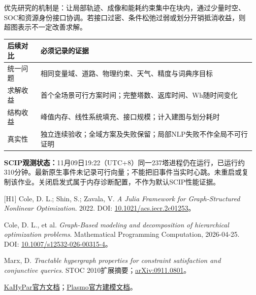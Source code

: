 \noindent 优先研究的机制是：让局部轨迹、成像和能耗约束集中在块内，通过少量时空、SOC和资源身份接口协调。若接口过密、条件松弛过弱或划分开销抵消收益，则超图表示不一定改善求解。

\begin{center}\small
\begin{tabular}{p{36mm}p{109mm}}\toprule
后续对比 & 必须记录的证据\\\midrule
统一问题 & 相同变量域、道路、物理约束、天气、精度与词典序目标\\
求解收益 & 首个全场景可行方案时间；完整塔数、返库时间、Wh随时间变化\\
结构收益 & 峰值内存、线性系统填充、接口规模；计入建图与划分耗时\\
真实性 & 独立连续验收；全域方案及失败保留；局部NLP失败不作全局不可行证明\\\bottomrule
\end{tabular}\end{center}

\noindent \textbf{SCIP观测状态：}11月09日19:22（UTC+8）同一237塔进程仍在运行，已运行约310分钟。最新原生事件未记录可行向量；不能把旧事件当实时心跳。未重启或复制该作业。关闭启发式属于内存诊断配置，不作为默认SCIP性能证据。

\small
[H1] Cole, D. L.; Shin, S.; Zavala, V. \emph{A Julia Framework for Graph-Structured Nonlinear Optimization}. 2022. DOI: \href{https://doi.org/10.1021/acs.iecr.2c01253}{10.1021/acs.iecr.2c01253}。\par
[H2] Cole, D. L., et al. \emph{Graph-Based modeling and decomposition of hierarchical optimization problems}. Mathematical Programming Computation, 2026-04-25. DOI: \href{https://doi.org/10.1007/s12532-026-00315-4}{10.1007/s12532-026-00315-4}。\par
[H3] Marx, D. \emph{Tractable hypergraph properties for constraint satisfaction and conjunctive queries}. STOC 2010扩展摘要；\href{https://arxiv.org/abs/0911.0801}{arXiv:0911.0801}。\par
[H4] \href{https://kahypar.org/}{KaHyPar官方文档}；\href{https://plasmo-dev.github.io/Plasmo.jl/dev/documentation/modeling/}{Plasmo官方建模文档}。\normalsize
\clearpage
\begingroup\small
